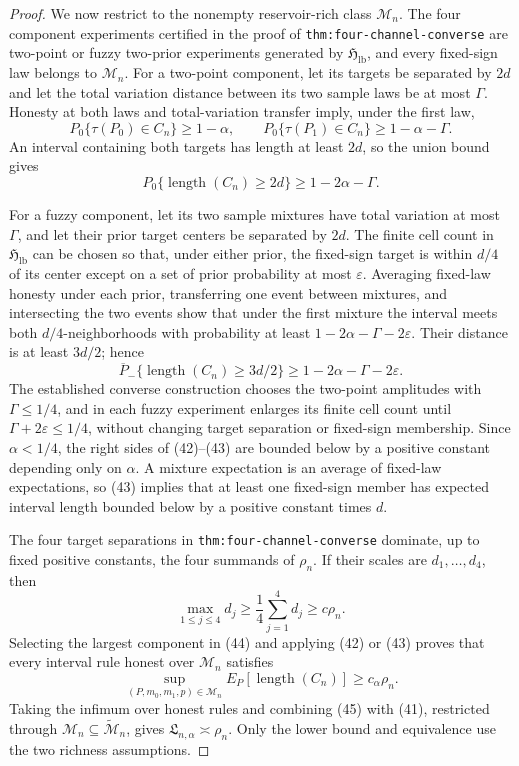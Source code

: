 \documentclass{article}
\begin{document}
\begin{proof}
We now restrict to the nonempty reservoir-rich class \(\mathcal M_n\).  The
four component experiments certified in the proof of
\texttt{thm:four-channel-converse} are two-point or fuzzy two-prior
experiments generated by \(\mathfrak H_{\mathrm{lb}}\), and every fixed-sign
law belongs to \(\mathcal M_n\).  For a two-point component, let its targets
be separated by \(2d\) and let the total variation distance between its two
sample laws be at most \(\Gamma\).  Honesty at both laws and total-variation
transfer imply, under the first law,
\[
P_0\{\tau(P_0)\in C_n\}\geq1-\alpha,
\qquad
P_0\{\tau(P_1)\in C_n\}\geq1-\alpha-\Gamma.
\]
An interval containing both targets has length at least \(2d\), so the union
bound gives
\[
P_0\{\operatorname{length}(C_n)\geq2d\}
\geq1-2\alpha-\Gamma.                                              \tag{42}
\]

For a fuzzy component, let its two sample mixtures have total variation at
most \(\Gamma\), and let their prior target centers be separated by \(2d\).
The finite cell count in \(\mathfrak H_{\mathrm{lb}}\) can be chosen so that,
under either prior, the fixed-sign target is within \(d/4\) of its center
except on a set of prior probability at most \(\varepsilon\).  Averaging
fixed-law honesty under each prior, transferring one event between mixtures,
and intersecting the two events show that under the first mixture the interval
meets both \(d/4\)-neighborhoods with probability at least
\(1-2\alpha-\Gamma-2\varepsilon\).  Their distance is at least \(3d/2\);
hence
\[
\overline P_-
\{\operatorname{length}(C_n)\geq3d/2\}
\geq1-2\alpha-\Gamma-2\varepsilon.                                 \tag{43}
\]
The established converse construction chooses the two-point amplitudes with
\(\Gamma\leq1/4\), and in each fuzzy experiment enlarges its finite cell count
until \(\Gamma+2\varepsilon\leq1/4\), without changing target separation or
fixed-sign membership.  Since \(\alpha<1/4\), the right sides of (42)--(43)
are bounded below by a positive constant depending only on \(\alpha\).  A
mixture expectation is an average of fixed-law expectations, so (43) implies
that at least one fixed-sign member has expected interval length bounded below
by a positive constant times \(d\).

The four target separations in \texttt{thm:four-channel-converse} dominate,
up to fixed positive constants, the four summands of \(\rho_n\).  If their
scales are \(d_1,\ldots,d_4\), then
\[
\max_{1\leq j\leq4}d_j
\geq\frac14\sum_{j=1}^4d_j
\geq c\rho_n.                                                       \tag{44}
\]
Selecting the largest component in (44) and applying (42) or (43) proves that
every interval rule honest over \(\mathcal M_n\) satisfies
\[
\sup_{(P,m_0,m_1,p)\in\mathcal M_n}
E_P[\operatorname{length}(C_n)]\geq c_\alpha\rho_n.                 \tag{45}
\]
Taking the infimum over honest rules and combining (45) with (41), restricted
through \(\mathcal M_n\subseteq\widetilde{\mathcal M}_n\), gives
\(\mathfrak L_{n,\alpha}\asymp\rho_n\).  Only the lower bound and equivalence
use the two richness assumptions.
\end{proof}
\end{document}
